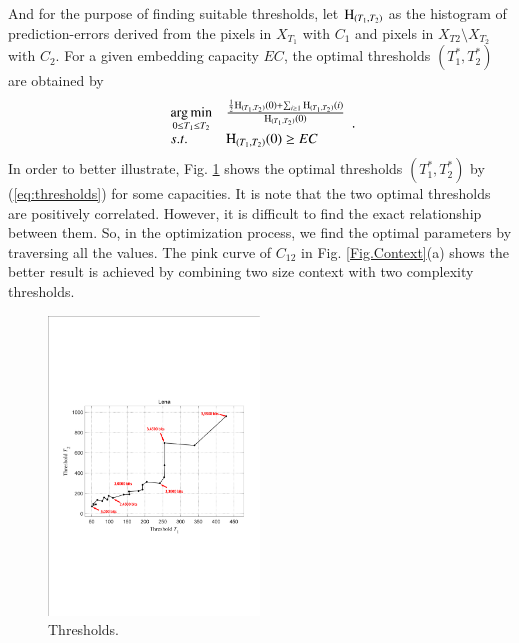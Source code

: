 \documentclass[review,3p,10pt,sort&compress]{elsarticle}
\begin{document}
And for the purpose of finding suitable thresholds, let ${\rm H}_{(T_1, T_2)}$ as the histogram of prediction-errors derived from the pixels in $X_{T_1}$ with $C_1$ and pixels in $X_{T2} \setminus X_{T_2}$ with $C_2$. For a given embedding capacity $EC$, the optimal thresholds $(T_1^*, T_2^*)$ are obtained by
\begin{equation}\label{eq:thresholds}
\begin{array}{ll}
\mathop{\arg\min}\limits_{0 \leq T_1 \leq T_2} & \frac{\frac{1}{2}{\rm H}_{(T_1, T_2)}(0) + \sum_{i \geq 1}{\rm H}_{(T_1, T_2)}(i)}{{\rm H}_{(T_1, T_2)}(0)}\\
s.t.                                    & {\rm H}_{(T_1, T_2)}(0) \geq EC
\end{array}.
\end{equation}
In order to better illustrate, Fig. \ref{Fig.Thresholds} shows the optimal thresholds $(T_1^*, T_2^*)$ by (\ref{eq:thresholds}) for some capacities. It is note that the two optimal thresholds are positively correlated. However, it is difficult to find the exact relationship between them. So, in the optimization process, we find the optimal parameters by traversing all the values. The pink curve of $C_{12}$ in Fig. \ref{Fig.Context}(a) shows the better result is achieved by combining two size context with two complexity thresholds.
\begin{figure}
\centering
\includegraphics[width=0.5\textwidth]{figures/Thresholds.pdf}
\centering
\caption{Thresholds.}
\label{Fig.Thresholds}
\end{figure}
\end{document}
